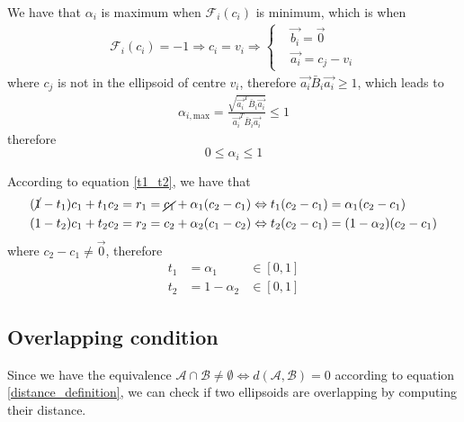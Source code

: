 \documentclass[class=report, float=false, crop=false]{standalone}
\begin{document}
We have that $\alpha_i$ is maximum when $\mathcal{F}_i(c_i)$ is minimum, which is when
\begin{align*}
\mathcal{F}_i(c_i) = -1 \Rightarrow c_i = v_i \Rightarrow \begin{cases} &\vec{b_i} = \vec{0} \\ &\vec{a_i} = c_j - v_i \end{cases}
\end{align*}
where $c_j$ is not in the ellipsoid of centre $v_i$, therefore $\vec{a_i}\bar{B}_i\vec{a_i} \geq 1$, which leads to
\begin{align*}
\alpha_{i,\text{max}} = \frac{\sqrt{\vec{a_i}^T\bar{B}_i\vec{a_i}}}{\vec{a_i}^T\bar{B}_i\vec{a_i}} \leq 1
\end{align*}
therefore
\begin{equation}
0 \leq \alpha_i \leq 1
\end{equation}

According to equation \ref{t1_t2}, we have that
\begin{align*}
(\cancel{1}-t_1)c_1 + t_1c_2 = r_1 = \cancel{c_1} + \alpha_1(c_2 - c_1) &\Leftrightarrow t_1(c_2 - c_1) = \alpha_1(c_2 - c_1)\\
(1 - t_2)c_1 + t_2c_2 = r_2 = c_2 + \alpha_2(c_1 - c_2) &\Leftrightarrow t_2(c_2 - c_1) = (1-\alpha_2)(c_2 - c_1)
\end{align*}
where $c_2 - c_1 \neq \vec{0}$, therefore
\begin{equation}
\boxed{
\begin{aligned}
t_1 &= \alpha_1 &\in [0,1]\\
t_2 &= 1 - \alpha_2 &\in[0,1]
\end{aligned}
}
\end{equation}

\subsection{Overlapping condition}
\label{distance_intersection}

Since we have the equivalence $\mathcal{A}\cap\mathcal{B} \neq \emptyset \Leftrightarrow d(\mathcal{A},\mathcal{B}) = 0$ according to equation \ref{distance_definition}, we can check if two ellipsoids are overlapping by computing their distance.



% 
\end{document}
